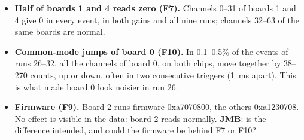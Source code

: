 \documentclass[11pt,a4paper]{article}
\begin{document}
\begin{itemize}
\item \textbf{Half of boards 1 and 4 reads zero (F7).} Channels 0--31 of boards 1 and 4 give 0
  in every event, in both gains and all nine runs; channels 32--63 of the same boards are
  normal. 
\item \textbf{Common-mode jumps of board 0 (F10).} In 0.1--0.5\% of the events of runs 26--32,
  all the channels of board 0, on both chips, move together by 38--270 counts, up or down,
  often in two consecutive triggers (1~ms apart). This is what made board 0 look noisier in
  run 26.
\item \textbf{Firmware (F9).} Board 2 runs firmware 0xa7070800, the others 0xa1230708. No
  effect is visible in the data: board 2 reads normally. \textbf{JMB}: is the difference
  intended, and could the firmware be behind F7 or F10?
\end{itemize}
\end{document}
